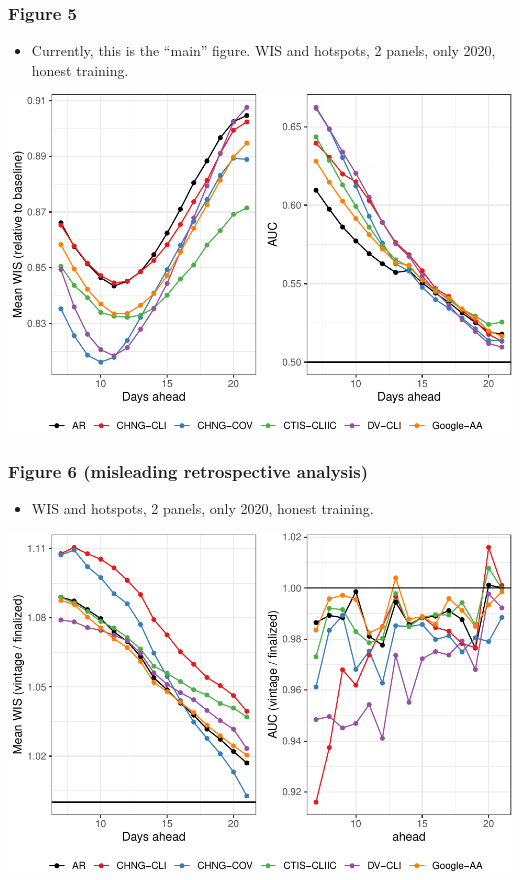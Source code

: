 \documentclass[9pt,twoside,lineno]{pnas-new}
\providecommand{\tightlist}{%
  \setlength{\itemsep}{0pt}\setlength{\parskip}{0pt}}
\begin{document}
\hypertarget{figure-5}{%
\subsubsection{Figure 5}\label{figure-5}}

\begin{itemize}
\tightlist
\item
  Currently, this is the ``main'' figure. WIS and hotspots, 2 panels,
  only 2020, honest training.
\end{itemize}

\begin{center}\includegraphics[width=\linewidth]{fig/figure5-1} \end{center}

\hypertarget{figure-6-misleading-retrospective-analysis}{%
\subsubsection{Figure 6 (misleading retrospective
analysis)}\label{figure-6-misleading-retrospective-analysis}}

\begin{itemize}
\tightlist
\item
  WIS and hotspots, 2 panels, only 2020, honest training.
\end{itemize}

\begin{center}\includegraphics[width=\linewidth]{fig/figure6-1} \end{center}
\end{document}
